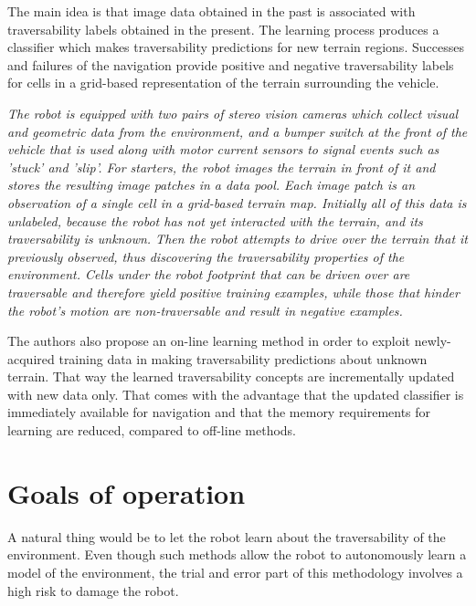 \documentclass[12pt,a4paper]{report}
\begin{document}
	The main idea is that image data  obtained in the past is associated with 
	traversability labels obtained in the  present. The learning process produces a 
	classifier which makes traversability  predictions for new terrain regions. 
	Successes and failures of the navigation provide positive and negative 
	traversability labels for cells in a grid-based representation of the terrain surrounding 
	the vehicle.
	
	\textit{The robot is equipped with two pairs of stereo vision cameras which 
	collect visual and geometric data from the environment, and a bumper switch
	at the front of the vehicle that is used along with motor current sensors to 
	signal events such as ’stuck’ and ’slip’.
	\newline
	For starters, the robot images the terrain in front of it and stores the 
	resulting image patches in a data pool. Each image patch is an observation 
	of a single cell in a grid-based terrain map. Initially all of this data is 
	unlabeled, because the robot has not yet interacted with the terrain, and its 
	traversability is unknown. 
	\newline
	Then the robot attempts to drive over the terrain that it previously 
	observed, thus discovering the traversability properties of the environment. 
	Cells under the robot footprint that can be driven over are traversable and 
	therefore yield positive training examples, while those that hinder the robot’s 
	motion are non-traversable	and result in negative examples.}
	
	The authors also propose an on-line learning method in order to exploit 
	newly-acquired training data in making traversability predictions about 
	unknown terrain. That way the learned traversability concepts are 
	incrementally updated with new data only. That comes with the advantage that the 
	updated classifier is immediately available for navigation and that the 
	memory requirements for learning are reduced, compared to off-line methods.
	\\
	
	\section{Goals of operation}
	\label{sec:bg:goals}
	
	A natural thing would be to let the robot learn about the 
	traversability of the environment. Even though such methods allow the robot to 
	autonomously learn a model of the environment, the trial and error part of this 
	methodology involves a high risk to damage the robot.
	\\
	
\end{document}
